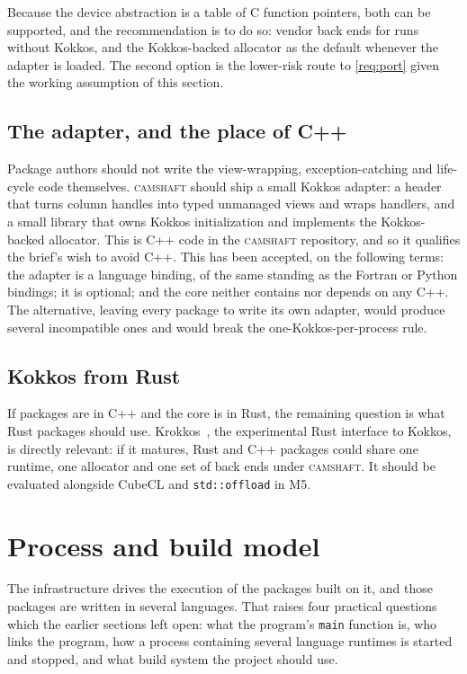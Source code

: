 \documentclass[11pt,a4paper]{article}
\newcommand{\camshaft}{\textsc{camshaft}}
\newcommand{\code}[1]{\texttt{#1}}
\begin{document}
Because the device abstraction is a table of C function pointers, both can be
supported, and the recommendation is to do so: vendor back ends for runs
without Kokkos, and the Kokkos-backed allocator as the default whenever the
adapter is loaded.  The second option is the lower-risk route to
\ref{req:port} given the working assumption of this section.

\subsection{The adapter, and the place of C++}

Package authors should not write the view-wrapping, exception-catching and
life-cycle code themselves.  \camshaft{} should ship a small Kokkos adapter: a
header that turns column handles into typed unmanaged views and wraps
handlers, and a small library that owns Kokkos initialization and implements
the Kokkos-backed allocator.  This is C++ code in the \camshaft{} repository, and
so it qualifies the brief's wish to avoid C++.  This has been accepted, on
the following terms: the adapter is a language binding, of the same standing
as the Fortran or Python bindings; it is optional; and the core neither
contains nor depends on any C++.  The alternative, leaving every package to write its
own adapter, would produce several incompatible ones and would break the
one-Kokkos-per-process rule.

\subsection{Kokkos from Rust}

If packages are in C++ and the core is in Rust, the remaining question is
what Rust packages should use.  Krokkos~\cite{krokkos}, the experimental Rust
interface to Kokkos, is directly relevant: if it matures, Rust and C++
packages could share one runtime, one allocator and one set of back ends
under \camshaft{}.  It should be evaluated alongside CubeCL and
\code{std::offload} in M5.

\section{Process and build model}
\label{sec:build}

The infrastructure drives the execution of the packages built on it, and
those packages are written in several languages.  That raises four practical
questions which the earlier sections left open: what the program's
\code{main} function is, who links the program, how a process containing
several language runtimes is started and stopped, and what build system the
project should use.
\end{document}
